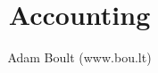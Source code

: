 \documentclass[oneside]{book}
\begin{document}
\author{Adam Boult (www.bou.lt)}
\title{Accounting}
\maketitle

\setcounter{tocdepth}{0}
\tableofcontents


\end{document}
